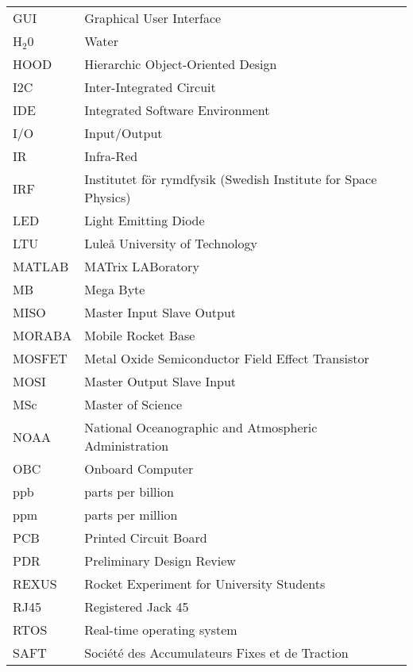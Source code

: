 \begin{longtable}{p{3cm} p{9cm}}
            GUI         & Graphical User Interface\\
            H$_2$0      & Water \\
            HOOD        & Hierarchic Object-Oriented Design\\
            I2C         & Inter-Integrated Circuit \\
            IDE         & Integrated Software Environment \\
            I/O         & Input/Output\\
            IR          & Infra-Red\\
            IRF         & Institutet för rymdfysik (Swedish Institute for Space Physics)\\
            LED         & Light Emitting Diode\\
            LTU         & Luleå University of Technology \\
            MATLAB      & MATrix LABoratory\\
            MB          & Mega Byte\\
            MISO        & Master Input Slave Output\\
            MORABA      & Mobile Rocket Base \\
            MOSFET      & Metal Oxide Semiconductor Field Effect Transistor\\
            MOSI        & Master Output Slave Input\\
            MSc         & Master of Science \\
            NOAA        & National Oceanographic and Atmospheric Administration \\
            OBC         & Onboard Computer\\
            ppb         & parts per billion\\
            ppm         & parts per million\\
            PCB         & Printed Circuit Board\\
            PDR         & Preliminary Design Review\\
            REXUS       & Rocket Experiment for University Students \\
            RJ45        & Registered Jack 45 \\
            RTOS        & Real-time operating system\\
            SAFT        & Soci\'{e}t\'{e} des Accumulateurs Fixes et de Traction\\

\end{longtable}
